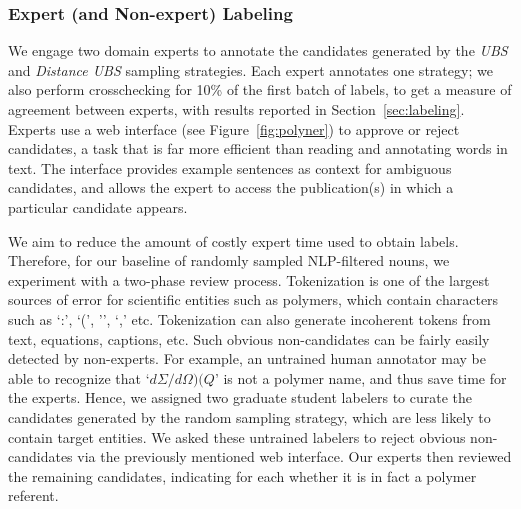 \subsubsection{Expert (and Non-expert) Labeling}
We engage two domain experts to annotate the candidates generated by the 
\textit{UBS} and \textit{Distance UBS} sampling strategies. 
Each expert annotates one strategy;
we also perform crosschecking for 10\% of the first batch of labels, to get a measure of agreement between experts,
with results reported in Section~\ref{sec:labeling}. 
Experts use a web interface (see Figure~\ref{fig:polyner}) to approve or reject candidates,
a task that is far more efficient than reading and annotating words in text.
The interface
provides example sentences as context for ambiguous candidates,
and allows the expert to access the publication(s) in which a particular candidate
appears. %

We aim to reduce the amount of costly expert time used to obtain labels.
Therefore, for our baseline of randomly sampled NLP-filtered nouns, we experiment with a two-phase review process.
Tokenization is one of the largest sources of error for scientific entities such as polymers, 
which contain characters such as `:', `(',
'\textendash', `,' etc. 
Tokenization can also generate incoherent tokens from text, equations, captions, etc.
Such obvious non-candidates can be fairly easily detected by non-experts.
For example, an untrained human annotator may be able to recognize that `$d\Sigma/d\Omega)(Q$' is not a polymer name, and thus save time for the experts.
Hence, we assigned two graduate student labelers to curate the candidates generated by the random sampling strategy, which are less likely to contain target entities.
We asked these untrained labelers to reject obvious non-candidates via the previously mentioned web interface. 
Our experts then reviewed the remaining
candidates, indicating for each whether it is in fact a polymer referent. %



